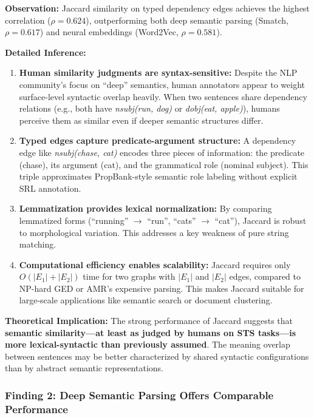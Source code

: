 \documentclass[11pt,a4paper]{article}
\begin{document}
\textbf{Observation:} Jaccard similarity on typed dependency edges achieves the highest correlation ($\rho = 0.624$), outperforming both deep semantic parsing (Smatch, $\rho = 0.617$) and neural embeddings (Word2Vec, $\rho = 0.581$).

\textbf{Detailed Inference:}
\begin{enumerate}
    \item \textbf{Human similarity judgments are syntax-sensitive:} Despite the NLP community's focus on ``deep'' semantics, human annotators appear to weight surface-level syntactic overlap heavily. When two sentences share dependency relations (e.g., both have \textit{nsubj(run, dog)} or \textit{dobj(eat, apple)}), humans perceive them as similar even if deeper semantic structures differ.
    
    \item \textbf{Typed edges capture predicate-argument structure:} A dependency edge like \textit{nsubj(chase, cat)} encodes three pieces of information: the predicate (chase), its argument (cat), and the grammatical role (nominal subject). This triple approximates PropBank-style semantic role labeling without explicit SRL annotation.
    
    \item \textbf{Lemmatization provides lexical normalization:} By comparing lemmatized forms (``running'' $\to$ ``run'', ``cats'' $\to$ ``cat''), Jaccard is robust to morphological variation. This addresses a key weakness of pure string matching.
    
    \item \textbf{Computational efficiency enables scalability:} Jaccard requires only $O(|E_1| + |E_2|)$ time for two graphs with $|E_1|$ and $|E_2|$ edges, compared to NP-hard GED or AMR's expensive parsing. This makes Jaccard suitable for large-scale applications like semantic search or document clustering.
\end{enumerate}

\textbf{Theoretical Implication:} The strong performance of Jaccard suggests that \textbf{semantic similarity---at least as judged by humans on STS tasks---is more lexical-syntactic than previously assumed}. The meaning overlap between sentences may be better characterized by shared syntactic configurations than by abstract semantic representations.

\subsubsection{Finding 2: Deep Semantic Parsing Offers Comparable Performance}
\end{document}
